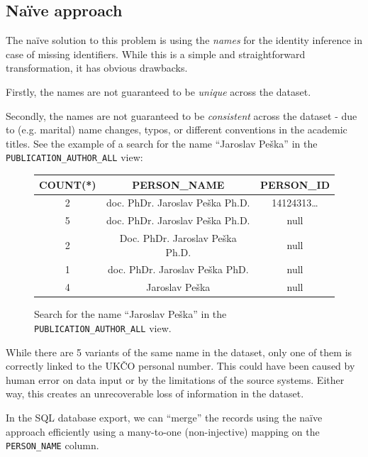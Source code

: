 \subsection{Naïve approach}\label{sec:naive-approach}

The naïve solution to this problem is using the \textit{names} for the identity inference 
in case of missing identifiers.
While this is a simple and straightforward transformation, it has obvious drawbacks.

Firstly, the names are not guaranteed to be \textit{unique} across the dataset. 

Secondly, the names are not guaranteed to be \textit{consistent} across the dataset - due to (e.g. marital) name changes, 
typos, or different conventions in the academic titles.
See the example of a search for the name ``Jaroslav Peška'' in the \texttt{PUBLICATION\_AUTHOR\_ALL} view:

\begin{figure}[!ht]\label{fig:jaroslav-peska}
    \captionsetup{width=.9\linewidth}
    \centering
    \begin{tabular}{|c|c|c|}
    \hline
        COUNT(*) & PERSON\_NAME & PERSON\_ID \\ \hline
        2 & doc. PhDr. Jaroslav Peška Ph.D. & 14124313\dots \footnotemark \\ \hline
        5 & doc. PhDr. Jaroslav Peška Ph.D. & null \\ \hline
        2 & Doc. PhDr. Jaroslav Peška Ph.D. & null \\ \hline
        1 & doc. PhDr. Jaroslav Peška PhD. & null \\ \hline
        4 & Jaroslav Peška & null \\ \hline
    \end{tabular}
    \caption{Search for the name ``Jaroslav Peška'' in the \texttt{PUBLICATION\_AUTHOR\_ALL} view.}
\end{figure}


While there are 5 variants of the same name in the dataset, only one of them is correctly linked to the UKČO personal number.
This could have been caused by human error on data input or by the limitations of the source systems. 
Either way, this creates an unrecoverable loss of information in the dataset.

In the SQL database export, we can ``merge'' the records using the naïve approach efficiently using a many-to-one (non-injective) mapping
on the \texttt{PERSON\_NAME} column.

